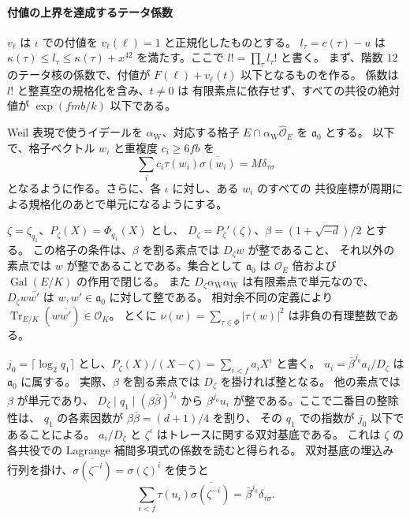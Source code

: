 \paragraph{付値の上界を達成するテータ係数}
\(v_\ell\) は \(\iota\) での付値を \(v_\ell(\ell)=1\) と正規化したものとする。
\(l_\tau=c(\tau)-u\) は \(\kappa(\tau)\le l_\tau\le\kappa(\tau)+x^{42}\)
を満たす。ここで \(l!=\prod_\tau l_\tau!\) と書く。
まず、階数 \(12\) のテータ核の係数で、付値が
\(F(\ell)+v_\ell(t)\) 以下となるものを作る。
係数は \(l!\) と整真空の規格化を含み、\(t\ne0\) は
有限素点に依存せず、すべての共役の絶対値が \(\exp(fmb/k)\) 以下である。

Weil 表現で使うイデールを \(\alpha_\mathrm{W}\)、対応する格子
\(E\cap\alpha_\mathrm{W}\widehat{\mathcal O}_E\) を \(\mathfrak a_0\) とする。
以下で、格子ベクトル \(w_i\) と重複度 \(c_i\ge6fb\) を
\begin{equation}\label{eq:attain-frame}
 \sum_i c_i\tau(w_i)\overline{\sigma(w_i)}=M\delta_{\tau\sigma}
\end{equation}
となるように作る。さらに、各 \(\iota\) に対し、ある \(w_i\) のすべての
共役座標が周期による規格化のあとで単元になるようにする。

\(\zeta=\zeta_{q_1}\)、\(P_\zeta(X)=\Phi_{q_1}(X)\) とし、
\(D_\zeta=P_\zeta'(\zeta)\)、\(\beta=(1+\sqrt{-d})/2\) とする。
この格子の条件は、\(\beta\) を割る素点では \(D_\zeta w\) が整であること、
それ以外の素点では \(w\) が整であることである。集合として
\(\mathfrak a_0\) は \(\mathcal O_E\) 倍および \(\operatorname{Gal}(E/K)\) の作用で閉じる。
また \(D_\zeta\alpha_\mathrm{W}\overline{\alpha_\mathrm{W}}\) は有限素点で単元なので、
\(D_\zeta w\overline{w'}\) は \(w,w'\in\mathfrak a_0\) に対して整である。
相対余不同の定義により \(\operatorname{Tr}_{E/K}(w\overline{w'})\in\mathcal O_K\)。
とくに \(\nu(w)=\sum_{\tau\in\Phi}|\tau(w)|^2\) は非負の有理整数である。

\(j_0=\lceil\log_2 q_1\rceil\) とし、\(P_\zeta(X)/(X-\zeta)=\sum_{i<f}a_iX^i\) と書く。
\(u_i=\bar\beta^{j_0}a_i/D_\zeta\) は \(\mathfrak a_0\) に属する。
実際、\(\beta\) を割る素点では \(D_\zeta\) を掛ければ整となる。
他の素点では \(\beta\) が単元であり、
\(D_\zeta\mid q_1\mid(\beta\bar\beta)^{j_0}\) から
\(\beta^{j_0}u_i\) が整である。ここで二番目の整除性は、
\(q_1\) の各素因数が \(\beta\bar\beta=(d+1)/4\) を割り、
その \(q_1\) での指数が \(j_0\) 以下であることによる。
\(a_i/D_\zeta\) と \(\zeta^i\) はトレースに関する双対基底である。
これは \(\zeta\) の各共役での Lagrange 補間多項式の係数を読むと得られる。
双対基底の埋込み行列を掛け、\(\overline{\sigma(\zeta^{-i})}=\sigma(\zeta)^i\)
を使うと
\[
 \sum_{i<f}\tau(u_i)\overline{\sigma(\zeta^{-i})}
     =\bar\beta^{j_0}\delta_{\tau\sigma}.
\]

